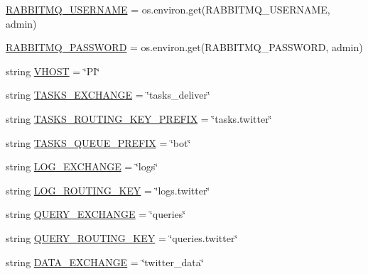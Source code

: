 \begin{DoxyCompactItemize}
\item 
\hyperlink{namespacetwitter_1_1credentials_a7ba15a9593305f975ef045e1a2415a00}{R\+A\+B\+B\+I\+T\+M\+Q\+\_\+\+U\+S\+E\+R\+N\+A\+ME} = os.\+environ.\+get(\textquotesingle{}R\+A\+B\+B\+I\+T\+M\+Q\+\_\+\+U\+S\+E\+R\+N\+A\+ME\textquotesingle{}, \textquotesingle{}admin\textquotesingle{})
\item 
\hyperlink{namespacetwitter_1_1credentials_a920d70b318c197be4c1b96cba16829f4}{R\+A\+B\+B\+I\+T\+M\+Q\+\_\+\+P\+A\+S\+S\+W\+O\+RD} = os.\+environ.\+get(\textquotesingle{}R\+A\+B\+B\+I\+T\+M\+Q\+\_\+\+P\+A\+S\+S\+W\+O\+RD\textquotesingle{}, \textquotesingle{}admin\textquotesingle{})
\item 
string \hyperlink{namespacetwitter_1_1credentials_a12b1df4ccd5699356f2ecaed20db4e7a}{V\+H\+O\+ST} = \char`\"{}PI\char`\"{}
\item 
string \hyperlink{namespacetwitter_1_1credentials_a6801fc86510b082846ef91e8b90113d9}{T\+A\+S\+K\+S\+\_\+\+E\+X\+C\+H\+A\+N\+GE} = \char`\"{}tasks\+\_\+deliver\char`\"{}
\item 
string \hyperlink{namespacetwitter_1_1credentials_a54a2d7fc5c80deb514351addb957b2b0}{T\+A\+S\+K\+S\+\_\+\+R\+O\+U\+T\+I\+N\+G\+\_\+\+K\+E\+Y\+\_\+\+P\+R\+E\+F\+IX} = \char`\"{}tasks.\+twitter\char`\"{}
\item 
string \hyperlink{namespacetwitter_1_1credentials_abe65552cc95679c94efe6abc25fb48c1}{T\+A\+S\+K\+S\+\_\+\+Q\+U\+E\+U\+E\+\_\+\+P\+R\+E\+F\+IX} = \char`\"{}bot\char`\"{}
\item 
string \hyperlink{namespacetwitter_1_1credentials_ab9f435cdf5ce634146350135e6bb9fa7}{L\+O\+G\+\_\+\+E\+X\+C\+H\+A\+N\+GE} = \char`\"{}logs\char`\"{}
\item 
string \hyperlink{namespacetwitter_1_1credentials_a443792e40400e51c8f0168a27feebc97}{L\+O\+G\+\_\+\+R\+O\+U\+T\+I\+N\+G\+\_\+\+K\+EY} = \char`\"{}logs.\+twitter\char`\"{}
\item 
string \hyperlink{namespacetwitter_1_1credentials_aa924c42005e9087c1b18a345b66fd569}{Q\+U\+E\+R\+Y\+\_\+\+E\+X\+C\+H\+A\+N\+GE} = \char`\"{}queries\char`\"{}
\item 
string \hyperlink{namespacetwitter_1_1credentials_a59b4cddba5f31dcd33def2abb616a85d}{Q\+U\+E\+R\+Y\+\_\+\+R\+O\+U\+T\+I\+N\+G\+\_\+\+K\+EY} = \char`\"{}queries.\+twitter\char`\"{}
\item 
string \hyperlink{namespacetwitter_1_1credentials_a1906487cddb830ce6f26ca377db178b3}{D\+A\+T\+A\+\_\+\+E\+X\+C\+H\+A\+N\+GE} = \char`\"{}twitter\+\_\+data\char`\"{}
\item 

\end{DoxyCompactItemize}
